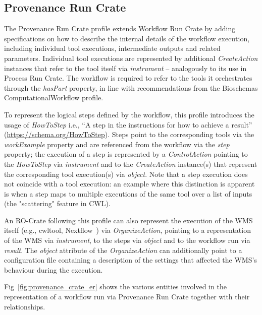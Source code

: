 \documentclass[10pt,letterpaper]{article}
\begin{document}
\subsection{Provenance Run Crate}\label{provenance-run-crate}

The Provenance Run Crate profile extends Workflow Run Crate by adding specifications on how to describe the internal details of the workflow execution, including individual tool executions, intermediate outputs and related parameters.
Individual tool executions are represented by additional \emph{CreateAction} instances that refer to the tool itself via \emph{instrument} -- analogously to its use in Process Run Crate.
The workflow is required to refer to the tools it orchestrates through the \emph{hasPart} property, in line with recommendations from the Bioschemas ComputationalWorkflow profile.

To represent the logical steps defined by the workflow, this profile introduces the usage of \emph{HowToStep} i.e., “A step in the instructions for how to achieve a result” (\url{https://schema.org/HowToStep}).
Steps point to the corresponding tools via the \emph{workExample} property and are referenced from the workflow via the \emph{step} property; the execution of a step is represented by a \emph{ControlAction} pointing to the
\emph{HowToStep} via \emph{instrument} and to the \emph{CreateAction}
instance(s) that represent the corresponding tool execution(s) via
\emph{object}.
Note that a step execution does not coincide with a tool execution: an example where this distinction is apparent is when a step maps to multiple executions of the same tool over a list of inputs (the "scattering" feature in CWL).

An RO-Crate following this profile can also represent the execution of the WMS itself (e.g., cwltool, Nextflow~\cite{Di Tommaso 2017}) via
\emph{OrganizeAction}, pointing to a representation of the WMS via
\emph{instrument}, to the steps via \emph{object} and to the workflow run via \emph{result}.
The \emph{object} attribute of the
\emph{OrganizeAction} can additionally point to a configuration file containing a description of the settings that affected the WMS's behaviour during the execution.

Fig~\ref{fig:provenance_crate_er} shows the various entities involved in the representation of a workflow run via Provenance Run Crate together with their relationships.
\end{document}
